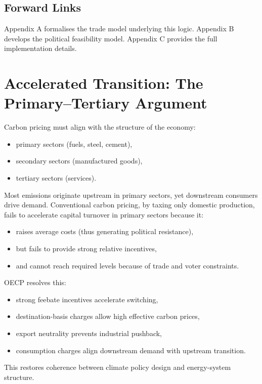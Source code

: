 \documentclass[12pt]{article}
\begin{document}
\subsection{Forward Links}

Appendix A formalises the trade model underlying this logic.  
Appendix B develops the political feasibility model.  
Appendix C provides the full implementation details.

\section{Accelerated Transition: The Primary--Tertiary Argument}

Carbon pricing must align with the structure of the economy:
\begin{itemize}
    \item primary sectors (fuels, steel, cement),
    \item secondary sectors (manufactured goods),
    \item tertiary sectors (services).
\end{itemize}

Most emissions originate upstream in primary sectors, yet downstream consumers drive
demand.  
Conventional carbon pricing, by taxing only domestic production, fails to accelerate
capital turnover in primary sectors because it:
\begin{itemize}
    \item raises average costs (thus generating political resistance),
    \item but fails to provide strong relative incentives,
    \item and cannot reach required levels because of trade and voter constraints.
\end{itemize}

OECP resolves this:
\begin{itemize}
    \item strong feebate incentives accelerate switching,
    \item destination-basis charges allow high effective carbon prices,
    \item export neutrality prevents industrial pushback,
    \item consumption charges align downstream demand with upstream transition.
\end{itemize}

This restores coherence between climate policy design and energy-system structure.
\end{document}

